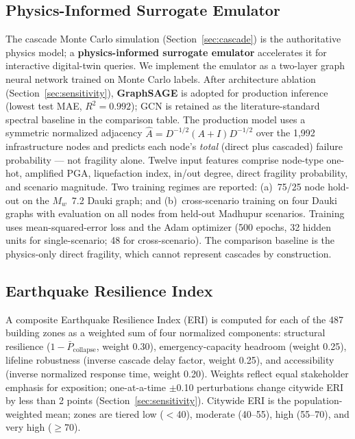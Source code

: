 \documentclass[a4paper,fleqn]{cas-sc}
\begin{document}
\subsection{Physics-Informed Surrogate Emulator}
\label{sec:surrogate}
The cascade Monte Carlo simulation (Section~\ref{sec:cascade}) is the
authoritative physics model; a \textbf{physics-informed surrogate emulator}
accelerates it for interactive digital-twin queries. We implement the emulator
as a two-layer graph neural network trained on Monte Carlo labels. After
architecture ablation (Section~\ref{sec:sensitivity}), \textbf{GraphSAGE}
\cite{hamilton2017} is adopted for production inference (lowest test MAE,
$R^2 = 0.992$); GCN \cite{kipf2017} is retained as the literature-standard
spectral baseline in the comparison table. The production model uses a
symmetric normalized adjacency $\hat{A} = D^{-1/2}(A+I)D^{-1/2}$ over the
1{,}992 infrastructure nodes and predicts each node's \textit{total}
(direct plus cascaded) failure probability --- not fragility alone.
Twelve input features comprise node-type one-hot, amplified PGA, liquefaction
index, in/out degree, direct fragility probability, and scenario magnitude.
Two training regimes are reported:
(a)~75/25 node hold-out on the $M_w$~7.2 Dauki graph; and (b)~cross-scenario
training on four Dauki graphs with evaluation on all nodes from held-out
Madhupur scenarios. Training uses mean-squared-error loss and the Adam
optimizer (500 epochs, 32 hidden units for single-scenario; 48 for
cross-scenario). The comparison baseline is the physics-only direct
fragility, which cannot represent cascades by construction.

\subsection{Earthquake Resilience Index}
\label{sec:eri}
A composite Earthquake Resilience Index (ERI) is computed for each of the
487 building zones as a weighted sum of four normalized components:
structural resilience ($1 - \bar{P}_{\mathrm{collapse}}$, weight 0.30),
emergency-capacity headroom (weight 0.25), lifeline robustness
(inverse cascade delay factor, weight 0.25), and accessibility
(inverse normalized response time, weight 0.20). Weights reflect equal
stakeholder emphasis for exposition; one-at-a-time $\pm$0.10 perturbations
change citywide ERI by less than 2 points (Section~\ref{sec:sensitivity}).
Citywide ERI is the population-weighted mean; zones are tiered low ($<$40),
moderate (40--55), high (55--70), and very high ($\geq$70).
\end{document}
